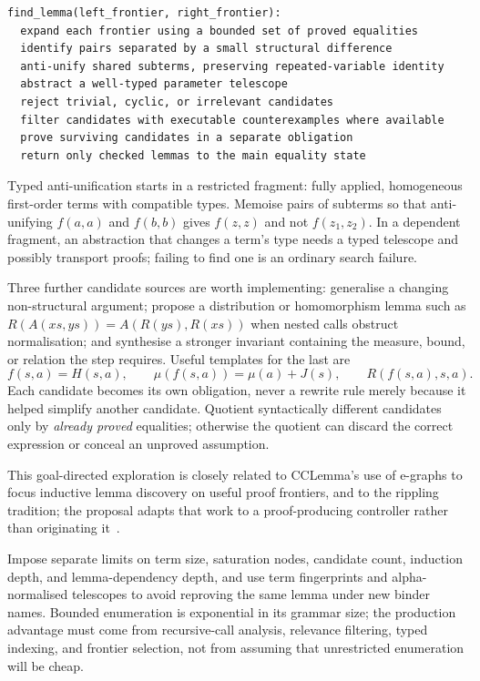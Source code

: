 \begin{lstlisting}
find_lemma(left_frontier, right_frontier):
  expand each frontier using a bounded set of proved equalities
  identify pairs separated by a small structural difference
  anti-unify shared subterms, preserving repeated-variable identity
  abstract a well-typed parameter telescope
  reject trivial, cyclic, or irrelevant candidates
  filter candidates with executable counterexamples where available
  prove surviving candidates in a separate obligation
  return only checked lemmas to the main equality state
\end{lstlisting}

Typed anti-unification starts in a restricted fragment: fully applied,
homogeneous first-order terms with compatible types. Memoise pairs of subterms
so that anti-unifying $f(a,a)$ and $f(b,b)$ gives $f(z,z)$ and not $f(z_1,z_2)$.
In a dependent fragment, an abstraction that changes a term's type needs a typed
telescope and possibly transport proofs; failing to find one is an ordinary
search failure.

Three further candidate sources are worth implementing: generalise a changing
non-structural argument; propose a distribution or homomorphism lemma such as
$R(A(xs,ys))=A(R(ys),R(xs))$ when nested calls obstruct normalisation; and
synthesise a stronger invariant containing the measure, bound, or relation the
step requires. Useful templates for the last are
\[
 f(s,a)=H(s,a),\qquad
 \mu(f(s,a))=\mu(a)+J(s),\qquad
 R(f(s,a),s,a).
\]
Each candidate becomes its own obligation, never a rewrite rule merely because
it helped simplify another candidate. Quotient syntactically different
candidates only by \emph{already proved} equalities; otherwise the quotient can
discard the correct expression or conceal an unproved assumption.

This goal-directed exploration is closely related to CCLemma's use of e-graphs
to focus inductive lemma discovery on useful proof frontiers, and to the
rippling tradition; the proposal adapts that work to a proof-producing
controller rather than originating
it~\cite{cclemma,rippling,directed-lemma-synthesis}.

Impose separate limits on term size, saturation nodes, candidate count,
induction depth, and lemma-dependency depth, and use term fingerprints and
alpha-normalised telescopes to avoid reproving the same lemma under new binder
names. Bounded enumeration is exponential in its grammar size; the production
advantage must come from recursive-call analysis, relevance filtering, typed
indexing, and frontier selection, not from assuming that unrestricted
enumeration will be cheap.

